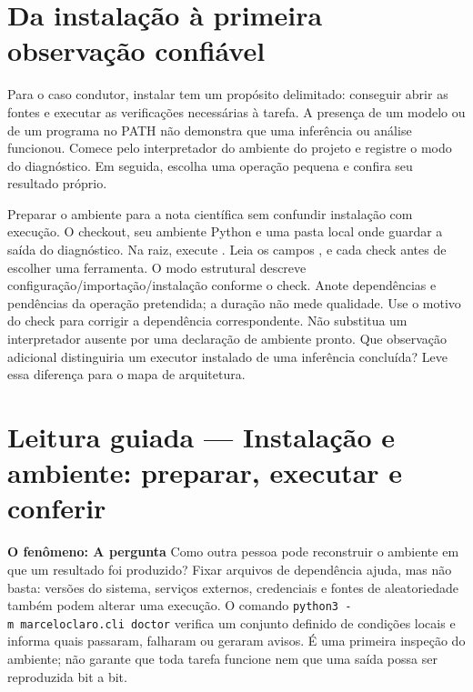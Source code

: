 


\section{Da instalação à primeira observação confiável}

Para o caso condutor, instalar tem um propósito delimitado: conseguir abrir as
fontes e executar as verificações necessárias à tarefa. A presença de um modelo
ou de um programa no PATH não demonstra que uma inferência ou análise funcionou.
Comece pelo interpretador do ambiente do projeto e registre o modo do diagnóstico.
Em seguida, escolha uma operação pequena e confira seu resultado próprio.

\praticacore
{Preparar o ambiente para a nota científica sem confundir instalação com execução.}
{O checkout, seu ambiente Python e uma pasta local onde guardar a saída do diagnóstico.}
{Na raiz, execute . Leia os campos
,  e cada check antes de escolher uma ferramenta.}
{O modo estrutural descreve configuração/importação/instalação conforme o check.
Anote dependências e pendências da operação pretendida; a duração não mede qualidade.}
{Use o motivo do check para corrigir a dependência correspondente. Não substitua
um interpretador ausente por uma declaração de ambiente pronto.}
{Que observação adicional distinguiria um executor instalado de uma inferência
concluída? Leve essa diferença para o mapa de arquitetura.}

\section[Leitura guiada]{Leitura guiada — Instalação e ambiente: preparar, executar e conferir}


\begin{descricao}
\textbf{O fenômeno: A pergunta}  Como outra pessoa pode reconstruir o ambiente em que um
resultado foi produzido? Fixar arquivos de dependência ajuda, mas não basta:
versões do sistema, serviços externos, credenciais e fontes de aleatoriedade
também podem alterar uma execução. O comando
\texttt{python3\ -m\ marceloclaro.cli\ doctor} verifica um conjunto definido de
condições locais e informa quais passaram, falharam ou geraram avisos. É uma
primeira inspeção do ambiente; não garante que toda tarefa funcione nem que uma
saída possa ser reproduzida bit a bit.
\end{descricao}

